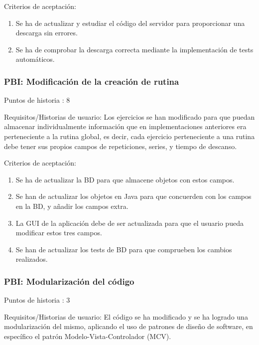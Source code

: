 \documentclass[11pt,a4paper]{report}
\begin{document}
Criterios de aceptación:
\begin{enumerate}
	\item Se ha de actualizar y estudiar el código del servidor para proporcionar una descarga sin errores.
	
	\item Se ha de comprobar la descarga correcta mediante la implementación de tests automáticos.
	
\end{enumerate}
\subsubsection{PBI: Modificación de la creación de rutina}
Puntos de historia : 8

Requisitos/Historias de usuario: Los ejercicios se han modificado para que puedan almacenar  individualmente información que en implementaciones anteriores era perteneciente a la rutina global, es decir, cada ejercicio perteneciente a una rutina debe tener sus propios campos de repeticiones, series, y tiempo de descanso.

Criterios de aceptación:
\begin{enumerate}
	\item Se ha de actualizar la BD para que almacene objetos con estos campos.
	
	\item Se han de actualizar los objetos en Java para que concuerden con los campos en la BD, y añadir los campos extra.
	
	\item La GUI de la aplicación debe de ser actualizada para que el usuario pueda modificar estos tres campos.
	
	\item Se han de actualizar los tests de BD para que comprueben los cambios realizados.
	
\end{enumerate}
\subsubsection{PBI: Modularización del código}
Puntos de historia : 3

Requisitos/Historias de usuario: El código se ha modificado y se ha logrado una modularización del mismo, aplicando el uso de patrones de diseño de software, en específico el patrón Modelo-Vista-Controlador (MCV).
\end{document}
